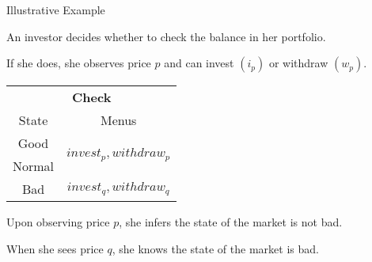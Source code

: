 \documentclass[usenames,dvipsnames,aspectratio=169,11pt, envcountsect, handout]{beamer}
\begin{document}
\begin{frame}{Illustrative Example}

	An investor decides whether to check the balance in her portfolio.

	\vfill

	If she does, she observes price \( p \) and can invest \( \left( i_{p} \right) \) or withdraw \( \left( w_p \right) \). \pause

	\vfill

	\begin{table}[H]
		\centering
		\begin{tabular}{c | c}
			\multicolumn{2}{c}{\textbf{Check}}                                                 \\
			State                & Menus                                                       \\
			\hline
			{\color{blue}Good}   & \multirow{2}{*}{{\color{blue}\( invest_{p}, withdraw_p \)}} \\
			{\color{blue}Normal} &                                                             \\
			\hline
			Bad                  & \(  invest_{q}, withdraw_q \)                               \\
		\end{tabular}
		\vspace{0.5cm} %
	\end{table} \pause

	\vfill

	Upon observing price \( p \), she infers the state of the market is not bad.

	\vfill

	When she sees price \( q \), she knows the state of the market is bad.

\end{frame}
\end{document}
